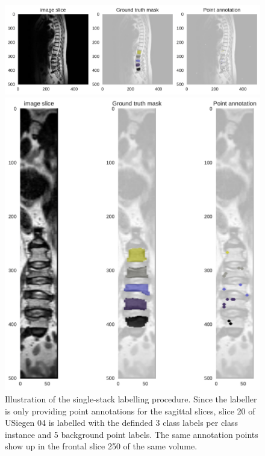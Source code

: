 \begin{figure}
    \centering
    \centering
    \begin{minipage}{.75\textwidth}
        \includegraphics[width=.99\textwidth]{images/USiegen004_s20_points.pdf}
    \end{minipage} 
    \vspace{1 mm}
    \begin{minipage}{.75\textwidth}
        \includegraphics[width=.99\textwidth]{images/USiegen004_s250_front_points.pdf}
    \end{minipage} 
    \vspace{2 mm}
    \caption{Illustration of the single-stack labelling procedure.
    Since the labeller is only providing point annotations for the sagittal slices, slice 20 of USiegen 04 is labelled with the definded 3 class labels per class instance and 5 background point labels.
    The same annotation points show up in the frontal slice 250 of the same volume. 
    \protect\label{fig:inferepoints_2}}
\end{figure}

